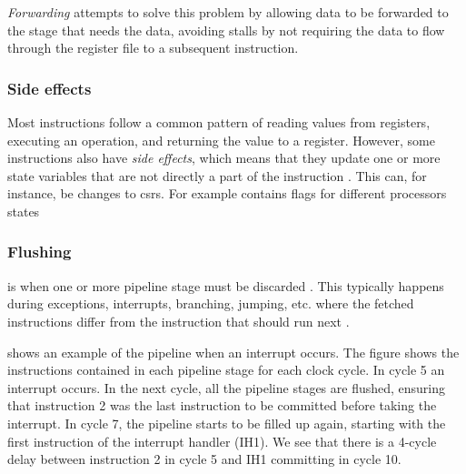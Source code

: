 \textit{Forwarding} attempts to solve this problem by allowing data to be forwarded to the stage that needs the data, avoiding stalls by not requiring the data to flow through the register file to a subsequent instruction.


\subsubsection{Side effects}

Most instructions follow a common pattern of reading values from registers, executing an operation, and returning the value to a register.
However, some instructions also have \textit{side effects}, which means that they update one or more state variables that are not directly a part of the instruction \cite{taylorAdvancedRISCVVerification2023}. This can, for instance, be changes to \acrshort{csr}s. For example  contains flags for different processors states 


%

\subsubsection{Flushing}

 is when one or more pipeline stage must be discarded . This typically happens during exceptions, interrupts, branching, jumping, etc. where the fetched instructions differ from the instruction that should run next \cite{pattersonComputerOrganizationDesign2021}.

 shows an example of the pipeline when an interrupt occurs. The figure shows the instructions contained in each pipeline stage for each clock cycle. In cycle 5 an interrupt occurs. In the next cycle, all the pipeline stages are flushed, ensuring that instruction 2 was the last instruction to be committed before taking the interrupt. In cycle 7, the pipeline starts to be filled up again, starting with the first instruction of the interrupt handler (IH1). We see that there is a 4-cycle delay between instruction 2 in cycle 5 and IH1 committing in cycle 10.

